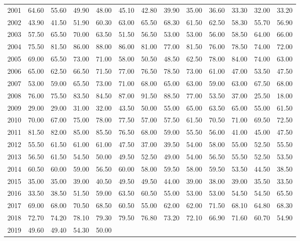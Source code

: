 \begin{longtable}{rrrrrrrrrrrrr}
  2001 & 64.60 & 55.60 & 49.90 & 48.00 & 45.10 & 42.80 & 39.90 & 35.00 & 36.60 & 33.30 & 32.00 & 33.20 \\ 
  2002 & 43.90 & 41.50 & 51.90 & 60.30 & 63.00 & 65.50 & 68.30 & 61.50 & 62.50 & 58.30 & 55.70 & 56.90 \\ 
  2003 & 57.50 & 65.50 & 70.00 & 63.50 & 51.50 & 56.50 & 53.00 & 53.00 & 56.00 & 58.50 & 64.00 & 66.00 \\ 
  2004 & 75.50 & 81.50 & 86.00 & 88.00 & 86.00 & 81.00 & 77.00 & 81.50 & 76.00 & 78.50 & 74.00 & 72.00 \\ 
  2005 & 69.00 & 65.50 & 73.00 & 71.00 & 58.00 & 50.50 & 48.50 & 62.50 & 78.00 & 84.00 & 74.00 & 63.00 \\ 
  2006 & 65.00 & 62.50 & 66.50 & 71.50 & 77.00 & 76.50 & 78.50 & 73.00 & 61.00 & 47.00 & 53.50 & 47.50 \\ 
  2007 & 53.00 & 59.00 & 65.50 & 73.00 & 71.00 & 68.00 & 65.00 & 63.00 & 59.00 & 63.00 & 67.50 & 68.00 \\ 
  2008 & 76.00 & 75.50 & 83.50 & 84.50 & 87.00 & 91.50 & 88.50 & 77.00 & 53.50 & 37.00 & 25.50 & 18.00 \\ 
  2009 & 29.00 & 29.00 & 31.00 & 32.00 & 43.50 & 50.00 & 55.00 & 65.00 & 63.50 & 65.00 & 55.00 & 61.50 \\ 
  2010 & 70.00 & 67.00 & 75.00 & 78.00 & 77.50 & 57.00 & 57.50 & 61.50 & 70.50 & 71.00 & 69.50 & 72.50 \\ 
  2011 & 81.50 & 82.00 & 85.00 & 85.50 & 76.50 & 68.00 & 59.00 & 55.50 & 56.00 & 41.00 & 45.00 & 47.50 \\ 
  2012 & 55.50 & 61.50 & 61.00 & 61.00 & 47.50 & 37.00 & 39.50 & 54.00 & 58.00 & 55.00 & 52.50 & 55.50 \\ 
  2013 & 56.50 & 61.50 & 54.50 & 50.00 & 49.50 & 52.50 & 49.00 & 54.00 & 56.50 & 55.50 & 52.50 & 53.50 \\ 
  2014 & 60.50 & 60.00 & 59.00 & 56.50 & 60.00 & 58.00 & 59.50 & 58.00 & 59.50 & 53.50 & 44.50 & 38.50 \\ 
  2015 & 35.00 & 35.00 & 39.00 & 40.50 & 49.50 & 49.50 & 44.00 & 39.00 & 38.00 & 39.00 & 35.50 & 33.50 \\ 
  2016 & 33.50 & 38.50 & 51.50 & 59.00 & 63.50 & 60.50 & 55.00 & 53.00 & 53.00 & 54.50 & 54.50 & 65.50 \\ 
  2017 & 69.00 & 68.00 & 70.50 & 68.50 & 60.50 & 55.00 & 62.00 & 62.00 & 71.50 & 68.10 & 64.80 & 68.30 \\ 
  2018 & 72.70 & 74.20 & 78.10 & 79.30 & 79.50 & 76.80 & 73.20 & 72.10 & 66.90 & 71.60 & 60.70 & 54.90 \\ 
  2019 & 49.60 & 49.40 & 54.30 & 50.00 &  &  &  &  &  &  &  &  \\ 
   \hline
\hline
\end{longtable}
